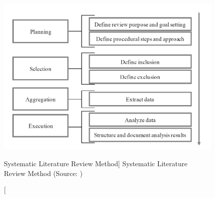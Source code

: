 \begin{figure}[ht]
    \includegraphics[width=0.8\linewidth]{images/methodology/litSearc.png}\centering
    \caption
    [Systematic Literature Review Method]
    {Systematic Literature Review Method (Source: \cite{Okoli2010AResearch})}
    \label{fig:litSearch}
\end{figure}

